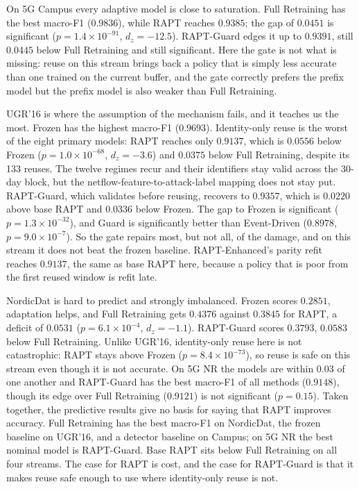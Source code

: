 \documentclass[conference]{IEEEtran}
\begin{document}


On 5G Campus every adaptive model is close to saturation. Full Retraining has the best
macro-F1 ($0.9836$), while RAPT reaches $0.9385$; the gap of $0.0451$ is significant
($p = 1.4 \times 10^{-91}$, $d_z = -12.5$). RAPT-Guard edges it up to $0.9391$, still
$0.0445$ below Full Retraining and still significant. Here the gate is not what is
missing: reuse on this stream brings back a policy that is simply less accurate than one
trained on the current buffer, and the gate correctly prefers the prefix model but the
prefix model is also weaker than Full Retraining.

UGR'16 is where the assumption of the mechanism fails, and it teaches us the most. Frozen
has the highest macro-F1 ($0.9693$). Identity-only reuse is the worst of the eight
primary models: RAPT reaches only $0.9137$, which is $0.0556$ below Frozen
($p = 1.0 \times 10^{-68}$, $d_z = -3.6$) and $0.0375$ below Full Retraining, despite its
133 reuses. The twelve regimes recur and their identifiers stay valid across the 30-day
block, but the netflow-feature-to-attack-label mapping does not stay put. RAPT-Guard,
which validates before reusing, recovers to $0.9357$, which is $0.0220$ above base RAPT and
$0.0336$ below Frozen. The gap to Frozen is significant ($p = 1.3 \times 10^{-32}$), and
Guard is significantly better than Event-Driven ($0.8978$, $p = 9.0 \times 10^{-7}$). So
the gate repairs most, but not all, of the damage, and on this stream it does not beat the
frozen baseline. RAPT-Enhanced's parity refit reaches
$0.9137$, the same as base RAPT here, because a policy that is poor from the first reused
window is refit late.

NordicDat is hard to predict and strongly imbalanced. Frozen scores $0.2851$, adaptation
helps, and Full Retraining gets $0.4376$ against $0.3845$ for RAPT, a deficit of $0.0531$
($p = 6.1 \times 10^{-4}$, $d_z = -1.1$). RAPT-Guard scores $0.3793$, $0.0583$ below Full
Retraining. Unlike UGR'16, identity-only reuse here is not catastrophic: RAPT stays above
Frozen ($p = 8.4 \times 10^{-73}$), so reuse is safe on this stream even though it is not
accurate. On 5G NR the models are within $0.03$ of one another and RAPT-Guard has the
best macro-F1 of all methods ($0.9148$), though its edge over Full Retraining ($0.9121$)
is not significant ($p=0.15$). Taken together, the predictive results give no basis for
saying that RAPT improves accuracy. Full Retraining has the best macro-F1 on NordicDat,
the frozen baseline on UGR'16, and a detector baseline on Campus; on 5G NR the best
nominal model is RAPT-Guard. Base RAPT sits below Full Retraining on all four streams. The
case for RAPT is cost, and the case for RAPT-Guard is that it makes reuse safe enough to
use where identity-only reuse is not.
\end{document}
